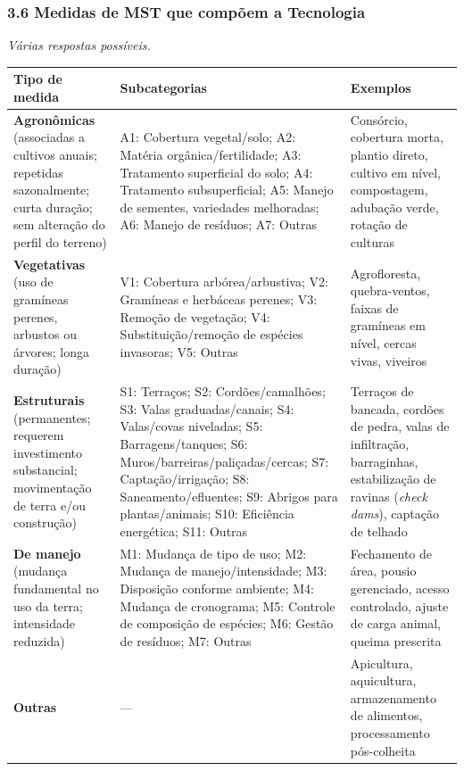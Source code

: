 \subsubsection{3.6 Medidas de MST que compõem a Tecnologia}\label{medidas-de-mst-que-compuxf5em-a-tecnologia}

\emph{Várias respostas possíveis.}

{
\begin{longtable}[]{@{}
  >{\raggedright\arraybackslash}p{}
  >{\raggedright\arraybackslash}p{}
  >{\raggedright\arraybackslash}p{}@{}}
\toprule\noalign{}
\begin{minipage}[b]{\linewidth}\raggedright
Tipo de medida
\end{minipage} & \begin{minipage}[b]{\linewidth}\raggedright
Subcategorias
\end{minipage} & \begin{minipage}[b]{\linewidth}\raggedright
Exemplos
\end{minipage} \\
\midrule\noalign{}
\endhead
\bottomrule\noalign{}
\endlastfoot
\textbf{Agronômicas} (associadas a cultivos anuais; repetidas sazonalmente; curta duração; sem alteração do perfil do terreno) & A1: Cobertura vegetal/solo; A2: Matéria orgânica/fertilidade; A3: Tratamento superficial do solo; A4: Tratamento subsuperficial; A5: Manejo de sementes, variedades melhoradas; A6: Manejo de resíduos; A7: Outras & Consórcio, cobertura morta, plantio direto, cultivo em nível, compostagem, adubação verde, rotação de culturas \\
\textbf{Vegetativas} (uso de gramíneas perenes, arbustos ou árvores; longa duração) & V1: Cobertura arbórea/arbustiva; V2: Gramíneas e herbáceas perenes; V3: Remoção de vegetação; V4: Substituição/remoção de espécies invasoras; V5: Outras & Agrofloresta, quebra-ventos, faixas de gramíneas em nível, cercas vivas, viveiros \\
\textbf{Estruturais} (permanentes; requerem investimento substancial; movimentação de terra e/ou construção) & S1: Terraços; S2: Cordões/camalhões; S3: Valas graduadas/canais; S4: Valas/covas niveladas; S5: Barragens/tanques; S6: Muros/barreiras/paliçadas/cercas; S7: Captação/irrigação; S8: Saneamento/efluentes; S9: Abrigos para plantas/animais; S10: Eficiência energética; S11: Outras & Terraços de bancada, cordões de pedra, valas de infiltração, barraginhas, estabilização de ravinas (\emph{check dams}), captação de telhado \\
\textbf{De manejo} (mudança fundamental no uso da terra; intensidade reduzida) & M1: Mudança de tipo de uso; M2: Mudança de manejo/intensidade; M3: Disposição conforme ambiente; M4: Mudança de cronograma; M5: Controle de composição de espécies; M6: Gestão de resíduos; M7: Outras & Fechamento de área, pousio gerenciado, acesso controlado, ajuste de carga animal, queima prescrita \\
\textbf{Outras} & --- & Apicultura, aquicultura, armazenamento de alimentos, processamento pós-colheita \\
\end{longtable}
}

